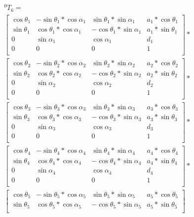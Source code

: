 \begin{multline}
	^0T_6=\\
	\begin{bmatrix}
\cos\theta_1 & -\sin\theta_1*\cos\alpha_1 & \sin\theta_1*\sin\alpha_1 & a_1*\cos\theta_1 \\
\sin\theta_1 & \cos\theta_1*\cos\alpha_1 & -\cos\theta_1*\sin\alpha_1 & a_1*\sin\theta_1 \\
0 & \sin\alpha_1 & \cos\alpha_1 & d_1 \\
0 & 0 & 0 & 1 \\
\end{bmatrix}
*\\
\begin{bmatrix}
\cos\theta_2 & -\sin\theta_2*\cos\alpha_2 & \sin\theta_2*\sin\alpha_2 & a_2*\cos\theta_2 \\
\sin\theta_2 & \cos\theta_2*\cos\alpha_2 & -\cos\theta_2*\sin\alpha_2 & a_2*\sin\theta_2 \\
0 & \sin\alpha_2 & \cos\alpha_2 & d_2 \\
0 & 0 & 0 & 1 \\
\end{bmatrix}
*\\
\begin{bmatrix}
\cos\theta_3 & -\sin\theta_3*\cos\alpha_3 & \sin\theta_3*\sin\alpha_3 & a_3*\cos\theta_3 \\
\sin\theta_3 & \cos\theta_3*\cos\alpha_3 & -\cos\theta_3*\sin\alpha_3 & a_3*\sin\theta_3 \\
0 & \sin\alpha_3 & \cos\alpha_3 & d_3 \\
0 & 0 & 0 & 1 \\
\end{bmatrix}
*\\
\begin{bmatrix}
\cos\theta_4 & -\sin\theta_4*\cos\alpha_4 & \sin\theta_4*\sin\alpha_4 & a_4*\cos\theta_4 \\
\sin\theta_4 & \cos\theta_4*\cos\alpha_4 & -\cos\theta_4*\sin\alpha_4 & a_4*\sin\theta_4 \\
0 & \sin\alpha_4 & \cos\alpha_4 & d_4 \\
0 & 0 & 0 & 1 \\
\end{bmatrix}
*\\
\begin{bmatrix}
\cos\theta_5 & -\sin\theta_5*\cos\alpha_5 & \sin\theta_5*\sin\alpha_5 & a_5*\cos\theta_5 \\
\sin\theta_5 & \cos\theta_5*\cos\alpha_5 & -\cos\theta_5*\sin\alpha_5 & a_5*\sin\theta_5 \\

\end{bmatrix}
\end{multline}
